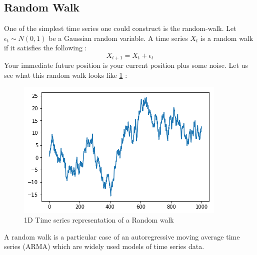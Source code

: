 \documentclass{article}
\theoremstyle{definition}
\begin{document}
\subsection{Random Walk}
One of the simplest time series one could construct is the random-walk. Let $\epsilon_{t}\sim N(0,1)$  be a Gaussian random variable. A time series $X_t$ is a random walk if it satisfies the following : 
\begin{equation}\label{rwalk}
    X_{t+1}=X_{t}+\epsilon_{t}
\end{equation}
Your immediate future position is your current position plus some noise. Let us see what this random walk looks like \ref{fig:randwalk} : 
\begin{figure}
    \includegraphics[width=\textwidth]{random_walk_1D.png}
    \caption{1D Time series representation of a Random walk}
    \label{fig:randwalk}
\end{figure}
A random walk is a particular case of an autoregressive moving average time series (ARMA) which are widely used models of time series data.
\end{document}
